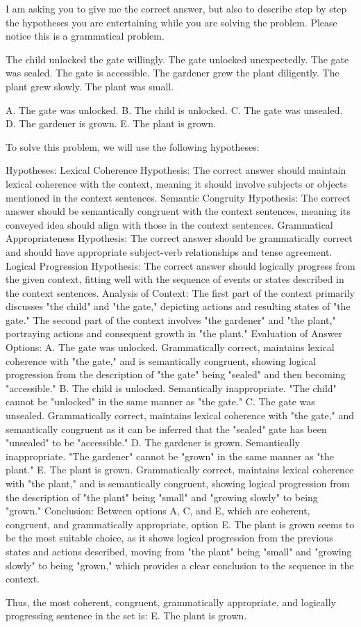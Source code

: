 I am asking you to give me the correct answer, but also to describe step by step  the hypotheses you are entertaining while you are solving the problem. Please notice this is a grammatical problem.

The child unlocked the gate willingly.
The gate unlocked unexpectedly.
The gate was sealed.
The gate is accessible.
The gardener grew the plant diligently.
The plant grew slowly.
The plant was small.

A. The gate was unlocked.
B. The child is unlocked.
C. The gate was unsealed.
D. The gardener is grown.
E. The plant is grown.


To solve this problem, we will use the following hypotheses:

Hypotheses:
Lexical Coherence Hypothesis: The correct answer should maintain lexical coherence with the context, meaning it should involve subjects or objects mentioned in the context sentences.
Semantic Congruity Hypothesis: The correct answer should be semantically congruent with the context sentences, meaning its conveyed idea should align with those in the context sentences.
Grammatical Appropriateness Hypothesis: The correct answer should be grammatically correct and should have appropriate subject-verb relationships and tense agreement.
Logical Progression Hypothesis: The correct answer should logically progress from the given context, fitting well with the sequence of events or states described in the context sentences.
Analysis of Context:
The first part of the context primarily discusses "the child" and "the gate," depicting actions and resulting states of "the gate."
The second part of the context involves "the gardener" and "the plant," portraying actions and consequent growth in "the plant."
Evaluation of Answer Options:
A. The gate was unlocked.
Grammatically correct, maintains lexical coherence with "the gate," and is semantically congruent, showing logical progression from the description of "the gate" being "sealed" and then becoming "accessible."
B. The child is unlocked.
Semantically inappropriate. "The child" cannot be "unlocked" in the same manner as "the gate."
C. The gate was unsealed.
Grammatically correct, maintains lexical coherence with "the gate," and semantically congruent as it can be inferred that the "sealed" gate has been "unsealed" to be "accessible."
D. The gardener is grown.
Semantically inappropriate. "The gardener" cannot be "grown" in the same manner as "the plant."
E. The plant is grown.
Grammatically correct, maintains lexical coherence with "the plant," and is semantically congruent, showing logical progression from the description of "the plant" being "small" and "growing slowly" to being "grown."
Conclusion:
Between options A, C, and E, which are coherent, congruent, and grammatically appropriate, option E. The plant is grown seems to be the most suitable choice, as it shows logical progression from the previous states and actions described, moving from "the plant" being "small" and "growing slowly" to being "grown," which provides a clear conclusion to the sequence in the context.

Thus, the most coherent, congruent, grammatically appropriate, and logically progressing sentence in the set is:
E. The plant is grown.